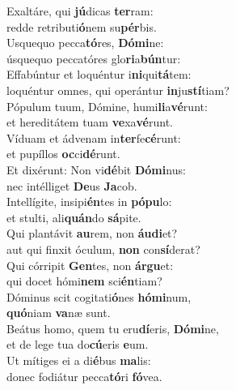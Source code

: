 \evenverse Exaltáre, qui \textbf{jú}dicas \textbf{ter}ram:~\*\\
\evenverse redde retributi\textbf{ó}nem su\textbf{pér}bis.\\
\oddverse Usquequo pecca\textbf{tó}res, \textbf{Dó}\textbf{mi}ne:~\*\\
\oddverse úsquequo peccatóres glo\textbf{ri}a\textbf{bún}tur:\\
\evenverse Effabúntur et loquéntur i\textbf{ni}qui\textbf{tá}tem:~\*\\
\evenverse loquéntur omnes, qui operántur \textbf{in}ju\textbf{stí}tiam?\\
\oddverse Pópulum tuum, Dómine, humi\textbf{li}a\textbf{vé}runt:~\*\\
\oddverse et hereditátem tuam \textbf{ve}xa\textbf{vé}runt.\\
\evenverse Víduam et ádvenam in\textbf{ter}fe\textbf{cé}runt:~\*\\
\evenverse et pupíllos \textbf{oc}ci\textbf{dé}runt.\\
\oddverse Et dixérunt: Non vi\textbf{dé}bit \textbf{Dó}\textbf{mi}nus:~\*\\
\oddverse nec intélliget \textbf{De}us \textbf{Ja}cob.\\
\evenverse Intellígite, insipi\textbf{én}tes in \textbf{pó}\textbf{pu}lo:~\*\\
\evenverse et stulti, ali\textbf{quán}do \textbf{sá}pite.\\
\oddverse Qui plantávit \textbf{au}rem, non \textbf{áu}\textbf{di}et?~\*\\
\oddverse aut qui finxit óculum, \textbf{non} con\textbf{sí}derat?\\
\evenverse Qui córripit \textbf{Gen}tes, non \textbf{ár}\textbf{gu}et:~\*\\
\evenverse qui docet hómi\textbf{nem} sci\textbf{én}tiam?\\
\oddverse Dóminus scit cogitati\textbf{ó}nes \textbf{hó}\textbf{mi}num,~\*\\
\oddverse \textbf{quó}niam \textbf{va}næ sunt.\\
\evenverse Beátus homo, quem tu eru\textbf{dí}eris, \textbf{Dó}\textbf{mi}ne,~\*\\
\evenverse et de lege tua do\textbf{cú}eris \textbf{e}um.\\
\oddverse Ut mítiges ei a di\textbf{é}bus \textbf{ma}lis:~\*\\
\oddverse donec fodiátur pecca\textbf{tó}ri \textbf{fó}vea.\\
